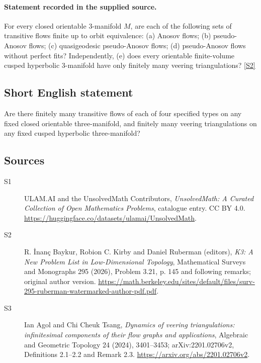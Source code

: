 \documentclass[11pt]{article}
\newcommand{\sref}[2]{\hyperlink{source:#1:#2}{[S#2]}}
\begin{document}
\paragraph{Statement recorded in the supplied source.}
For every closed orientable $3$-manifold $M$, are each of the following sets of transitive flows finite up to orbit equivalence: (a) Anosov flows; (b) pseudo-Anosov flows; (c) quasigeodesic pseudo-Anosov flows; (d) pseudo-Anosov flows without perfect fits? Independently, (e) does every orientable finite-volume cusped hyperbolic $3$-manifold have only finitely many veering triangulations? \sref{statement}{2}
\subsection{Short English statement}
Are there finitely many transitive flows of each of four specified types on any fixed closed orientable three-manifold, and finitely many veering triangulations on any fixed cusped hyperbolic three-manifold?
\subsection{Sources}
\begin{description}
\item[\hypertarget{source:statement:1}{S1}] ULAM.AI and the UnsolvedMath Contributors, \emph{UnsolvedMath: A Curated Collection of Open Mathematics Problems}, catalogue entry. CC BY 4.0. \url{https://huggingface.co/datasets/ulamai/UnsolvedMath}.
\item[\hypertarget{source:statement:2}{S2}] R. İnanç Baykur, Robion C. Kirby and Daniel Ruberman (editors), \emph{K3: A New Problem List in Low-Dimensional Topology}, Mathematical Surveys and Monographs 295 (2026), Problem 3.21, p. 145 and following remarks; original author version. \url{https://math.berkeley.edu/sites/default/files/surv-295-ruberman-watermarked-author-pdf.pdf}.
\item[\hypertarget{source:statement:3}{S3}] Ian Agol and Chi Cheuk Tsang, \emph{Dynamics of veering triangulations: infinitesimal components of their flow graphs and applications}, Algebraic and Geometric Topology 24 (2024), 3401--3453; arXiv:2201.02706v2, Definitions 2.1--2.2 and Remark 2.3. \url{https://arxiv.org/abs/2201.02706v2}.
\end{description}
\label{end:statement}
\end{document}
